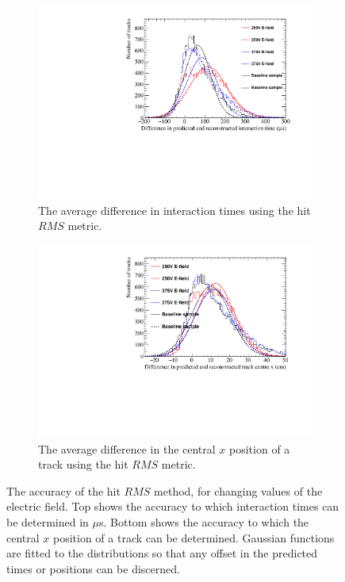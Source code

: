 \begin{figure}[h!]
  \centering
  \begin{subfigure}{0.6\textwidth}
    \centering
    \includegraphics[width=\textwidth]{Canvas_AvDiff_T_RMS_ElecField}
    \caption{The average difference in interaction times using the hit $RMS$ metric.}
    \label{fig:DiffElecStudy_AvDiffRMS_T}
  \end{subfigure}
  \begin{subfigure}{0.6\textwidth}
    \centering
    \includegraphics[width=\textwidth]{Canvas_AvDiff_X_RMS_ElecField}
    \caption{The average difference in the central $x$ position of a track using the hit $RMS$ metric.}
    \label{fig:DiffElecStudy_AvDiffRMS_X}
  \end{subfigure}
  \caption[Comparing the accuracy of the hit $RMS$ method, as the electric field changes]
          {The accuracy of the hit $RMS$ method, for changing values of the electric field. Top shows the accuracy to which interaction times can be determined in $\mu$s. Bottom shows the accuracy to which the central $x$ position of a track can be determined. Gaussian functions are fitted to the distributions so that any offset in the predicted times or positions can be discerned.}
  \label{fig:DiffElecStudy_AvDiff_RMS}
\end{figure}

